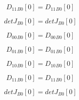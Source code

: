 \documentclass{article}
\begin{document}
\begin{dmath}{D_{11}{_{B0}}}[{0}] = {D_{11}{_{B0}}}[{0}]\end{dmath}

\begin{dmath}{detJ{_{B0}}}[{0}] = {detJ{_{B0}}}[{0}]\end{dmath}

\begin{dmath}{D_{00}{_{B0}}}[{0}] = {D_{00}{_{B0}}}[{0}]\end{dmath}

\begin{dmath}{D_{01}{_{B0}}}[{0}] = {D_{01}{_{B0}}}[{0}]\end{dmath}

\begin{dmath}{D_{10}{_{B0}}}[{0}] = {D_{10}{_{B0}}}[{0}]\end{dmath}

\begin{dmath}{D_{11}{_{B0}}}[{0}] = {D_{11}{_{B0}}}[{0}]\end{dmath}

\begin{dmath}{detJ{_{B0}}}[{0}] = {detJ{_{B0}}}[{0}]\end{dmath}
\end{document}
